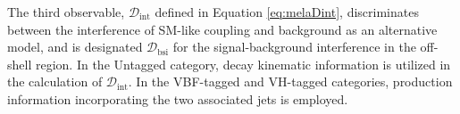 The third observable, $\mathcal{D}_\text{int}$ defined in Equation \ref{eq:melaDint}, discriminates between the interference
of SM-like \Hboson coupling and background as an alternative model, and is designated
$\mathcal{D}_\text{bsi}$ for the signal-background interference in the off-shell region.
In the Untagged category, decay kinematic information is utilized in the calculation of $\mathcal{D}_\text{int}$.
In the VBF-tagged and VH-tagged categories, production information incorporating the two associated jets is employed.



